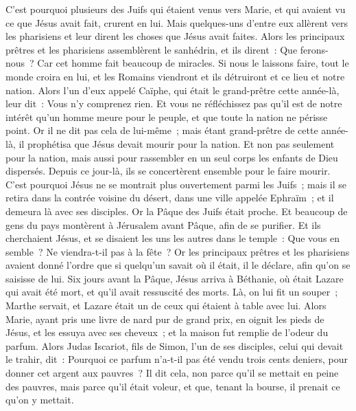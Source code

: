 \begin{multicols}{2}
C'est pourquoi plusieurs des Juifs qui étaient venus vers Marie, et qui avaient vu ce que Jésus avait fait, crurent en lui.
Mais quelques-uns d'entre eux allèrent vers les pharisiens et leur dirent les choses que Jésus avait faites.
Alors les principaux prêtres et les pharisiens assemblèrent le sanhédrin, et ils dirent~: Que ferons-nous~? Car cet homme fait beaucoup de miracles.
Si nous le laissons faire, tout le monde croira en lui, et les Romains viendront et ils détruiront et ce lieu et notre nation.
Alors l'un d'eux appelé Caïphe, qui était le grand-prêtre cette année-là, leur dit~: Vous n'y comprenez rien.
Et vous ne réfléchissez pas qu'il est de notre intérêt qu'un homme meure pour le peuple, et que toute la nation ne périsse point.
Or il ne dit pas cela de lui-même~; mais étant grand-prêtre de cette année-là, il prophétisa que Jésus devait mourir pour la nation.
Et non pas seulement pour la nation, mais aussi pour rassembler en un seul corps les enfants de Dieu dispersés.
Depuis ce jour-là, ils se concertèrent ensemble pour le faire mourir.
C'est pourquoi Jésus ne se montrait plus ouvertement parmi les Juifs~; mais il se retira dans la contrée voisine du désert, dans une ville appelée Ephraïm~; et il demeura là avec ses disciples.
Or la Pâque des Juifs était proche. Et beaucoup de gens du pays montèrent à Jérusalem avant Pâque, afin de se purifier.
Et ils cherchaient Jésus, et se disaient les uns les autres dans le temple~: Que vous en semble~? Ne viendra-t-il pas à la fête~?
Or les principaux prêtres et les pharisiens avaient donné l'ordre que si quelqu'un savait où il était, il le déclare, afin qu'on se saisisse de lui.
\VerseOne{}Six jours avant la Pâque, Jésus arriva à Béthanie, où était Lazare qui avait été mort, et qu'il avait ressuscité des morts.
Là, on lui fit un souper~; Marthe servait, et Lazare était un de ceux qui étaient à table avec lui.
Alors Marie, ayant pris une livre de nard pur de grand prix, en oignit les pieds de Jésus, et les essuya avec ses cheveux~; et la maison fut remplie de l'odeur du parfum.
Alors Judas Iscariot, fils de Simon, l'un de ses disciples, celui qui devait le trahir, dit~:
Pourquoi ce parfum n'a-t-il pas été vendu trois cents deniers, pour donner cet argent aux pauvres~?
Il dit cela, non parce qu'il se mettait en peine des pauvres, mais parce qu'il était voleur, et que, tenant la bourse, il prenait ce qu'on y mettait.

\end{multicols}
